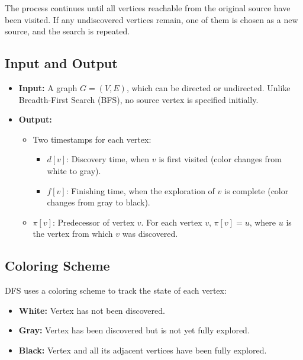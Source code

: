 The process continues until all vertices reachable from the original source have been visited. If any undiscovered vertices remain, one of them is chosen as a new source, and the search is repeated.

\subsection{Input and Output}
\begin{itemize}
    \item \textbf{Input:} A graph \(G = (V, E)\), which can be directed or undirected. Unlike Breadth-First Search (BFS), no source vertex is specified initially.
    \item \textbf{Output:} 
    \begin{itemize}
        \item Two timestamps for each vertex:
        \begin{itemize}
            \item \(d[v]\): Discovery time, when \(v\) is first visited (color changes from white to gray).
            \item \(f[v]\): Finishing time, when the exploration of \(v\) is complete (color changes from gray to black).
        \end{itemize}
        \item \(\pi[v]\): Predecessor of vertex \(v\). For each vertex \(v\), \(\pi[v] = u\), where \(u\) is the vertex from which \(v\) was discovered.
    \end{itemize}
\end{itemize}

\subsection{Coloring Scheme}
DFS uses a coloring scheme to track the state of each vertex:
\begin{itemize}
    \item \textbf{White:} Vertex has not been discovered.
    \item \textbf{Gray:} Vertex has been discovered but is not yet fully explored.
    \item \textbf{Black:} Vertex and all its adjacent vertices have been fully explored.
\end{itemize}

